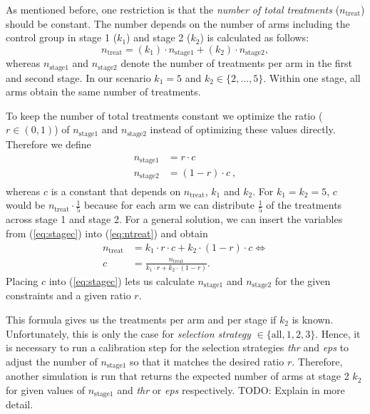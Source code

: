 \documentclass[bimj,fleqn]{w-art}
\theoremstyle{plain}
\theoremstyle{definition}
\begin{document}
As mentioned before, one restriction is that the \emph{number of total treatments} ($n_{\text{treat}}$) should be constant.
The number depends on the number of arms including the control group in stage 1 ($k_1$) and stage 2 ($k_2$) is calculated as follows:
\begin{equation}
  \label{eq:ntreat}
  n_{\text{treat}} = (k_1) \cdot n_{\text{stage1}} + (k_2) \cdot n_{\text{stage2}},
\end{equation}
whereas $n_{\text{stage1}}$ and $n_{\text{stage2}}$ denote the number of treatments per arm in the first and second stage.
In our scenario $k_1 = 5$ and $k_2 \in \{2, \ldots, 5\}$.
Within one stage, all arms obtain the same number of treatments.

To keep the number of total treatments constant we optimize the ratio ($r \in (0,1)$) of $n_{\text{stage1}}$ and $n_{\text{stage2}}$ instead of optimizing these values directly.
Therefore we define
\begin{align}
  \label{eq:stagec}
  \begin{split}
  n_{\text{stage1}} &= r \cdot c \\
  n_{\text{stage2}} &= (1-r) \cdot c \ ,
  \end{split}
\end{align}
whereas $c$ is a constant that depends on $n_{\text{treat}}$, $k_1$ and $k_2$.
For $k_1 = k_2 = 5$, $c$ would be $n_{\text{treat}} \cdot \frac{1}{5}$ because for each arm we can distribute $\frac{1}{5}$ of the treatments across stage 1 and stage 2.
For a general solution, we can insert the variables from (\ref{eq:stagec}) into (\ref{eq:ntreat}) and obtain
\begin{align}
  \label{eq:ntreatc}
  n_{\text{treat}} &= k_1 \cdot r \cdot c + k_2 \cdot (1-r) \cdot c \Leftrightarrow \\
  c &= \frac{n_{\text{treat}}}{k_1 \cdot r + k_2 \cdot (1-r)}.
\end{align}
Placing $c$ into (\ref{eq:stagec}) lets us calculate $n_{\text{stage1}}$ and $n_{\text{stage2}}$ for the given constraints and a given ratio $r$.

This formula gives us the treatments per arm and per stage if $k_2$ is known. 
Unfortunately, this is only the case for \emph{selection strategy} $\in \{\text{all},1,2,3\}$.
Hence, it is necessary to run a calibration step for the selection strategies \emph{thr} and \emph{eps} to adjust the number of $n_{\text{stage1}}$ so that it matches the desired ratio $r$.
Therefore, another simulation is run that returns the expected number of arms at stage 2 $k_2$ for given values of $n_{\text{stage1}}$ and  \emph{thr} or \emph{eps} respectively.
TODO: Explain in more detail.
\end{document}
